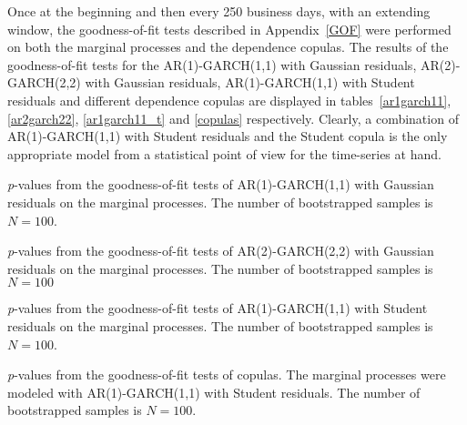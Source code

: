 Once at the beginning and then every 250 business days, with an
extending window, the goodness-of-fit tests described in
Appendix~\ref{GOF} were performed on both the marginal processes and
the dependence copulas. The results of the goodness-of-fit tests for
the AR(1)-GARCH(1,1) with Gaussian residuals, AR(2)-GARCH(2,2) with
Gaussian residuals, AR(1)-GARCH(1,1) with Student residuals and
different dependence copulas are displayed in
tables~\ref{ar1garch11}, \ref{ar2garch22}, \ref{ar1garch11_t} and
\ref{copulas} respectively. Clearly, a combination of
AR(1)-GARCH(1,1) with Student residuals and the Student copula is
the only appropriate model from a statistical point of view for the
time-series at hand.
\begin{table}[p]
    \begin{adjustwidth}{-1in}{-1in}
    \centering
    
    \end{adjustwidth}
    \caption[GOF tests of AR(1)-GARCH(1,1) with Gaussian residuals]{\emph{p}-values from the goodness-of-fit tests of AR(1)-GARCH(1,1) with Gaussian residuals on the marginal processes. The number of bootstrapped samples is $N=100$.}
    \label{ar1garch11}
\end{table}
\begin{table}[p]
    \begin{adjustwidth}{-1in}{-1in}
    \centering
    
    \end{adjustwidth}
    \caption[GOF tests of AR(2)-GARCH(2,2) with Gaussian residuals]{\emph{p}-values from the goodness-of-fit tests of AR(2)-GARCH(2,2) with Gaussian residuals on the marginal processes. The number of bootstrapped samples is $N=100$}
    \label{ar2garch22}
\end{table}
\begin{table}[p]
    \begin{adjustwidth}{-1in}{-1in}
    \centering
    
    \end{adjustwidth}
    \caption[GOF tests of AR(1)-GARCH(1,1) with Student residuals]{\emph{p}-values from the goodness-of-fit tests of AR(1)-GARCH(1,1) with Student residuals on the marginal processes. The number of bootstrapped samples is $N=100$.}
    \label{ar1garch11_t}
\end{table}
\begin{table}[htb]
    \begin{adjustwidth}{-1in}{-1in}
    \centering
    
    \end{adjustwidth}
    \caption[GOF test of dependence copulas]{\emph{p}-values from the goodness-of-fit tests of copulas. The marginal processes were modeled with AR(1)-GARCH(1,1) with Student residuals. The number of bootstrapped samples is $N=100$.}
    \label{copulas}
\end{table}

